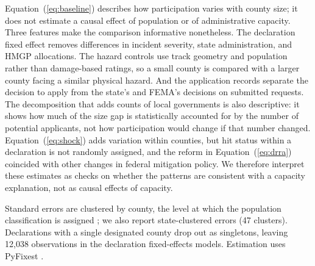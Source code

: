 Equation~(\ref{eq:baseline}) describes how participation varies with county size; it does not estimate a causal effect of population or of administrative capacity. Three features make the comparison informative nonetheless. The declaration fixed effect removes differences in incident severity, state administration, and HMGP allocations. The hazard controls use track geometry and population rather than damage-based ratings, so a small county is compared with a larger county facing a similar physical hazard. And the application records separate the decision to apply from the state's and FEMA's decisions on submitted requests. The decomposition that adds counts of local governments is also descriptive: it shows how much of the size gap is statistically accounted for by the number of potential applicants, not how participation would change if that number changed. Equation~(\ref{eq:shock}) adds variation within counties, but hit status within a declaration is not randomly assigned, and the reform in Equation~(\ref{eq:drra}) coincided with other changes in federal mitigation policy. We therefore interpret these estimates as checks on whether the patterns are consistent with a capacity explanation, not as causal effects of capacity.

Standard errors are clustered by county, the level at which the population classification is assigned \parencite{abadie2023cluster,cameron2015practitioner}; we also report state-clustered errors (47 clusters). Declarations with a single designated county drop out as singletons, leaving 12,038 observations in the declaration fixed-effects models. Estimation uses PyFixest \parencite{pyfixest}.

